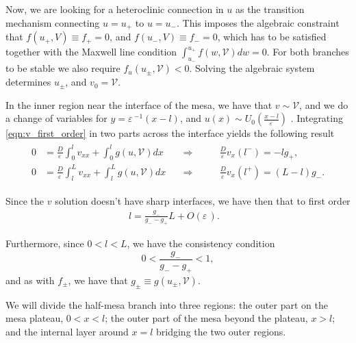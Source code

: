 \documentclass[a4paper,10pt]{article}
\newcommand{\Ep}{\ensuremath{\varepsilon\,}}
\newcommand{\VV}{\ensuremath{\mathcal{V}}}
\begin{document}
Now, we are looking for a heteroclinic connection in $u$ as the transition mechanism connecting $u=u_+$ to $u=u_-$. This imposes the algebraic constraint that $f(u_+,V)\equiv f_+ = 0$, and $ f(u_-,V) \equiv f_- = 0$, which has to be satisfied together with the Maxwell line condition \cite{maxwell1994} $\int_{u_-}^{u_+} f(w,\VV)dw = 0$. For both branches to be stable we also require $f_u(u_{\pm},\VV)<0$. Solving the algebraic system determines $u_{\pm}$, and $v_0=\VV$.

In the inner region near the interface of the mesa, we have that $v\sim\VV$, and we do a change of variables for $y=\Ep^{-1}(x-l)$, and $u(x)\sim U_0(\frac{x-l}{\Ep})$ . Integrating \eqref{eqn:v_first_order} in two parts across the interface yields the following result
% 
\begin{equation*}
\label{eqn:w_eqn}
\begin{split}
\begin{aligned}
  0 &= \frac{D}{\Ep}\int_0^lv_{xx}+\int_0^lg(u,\VV)dx\quad&\Rightarrow&\qquad \frac{D}{\Ep}v_x(l^-)=-lg_+,\\
  0 &= \frac{D}{\Ep}\int_l^Lv_{xx}+\int_l^Lg(u,\VV)dx\quad&\Rightarrow&\qquad \frac{D}{\Ep}v_x(l^+)=(L-l)g_-.
\end{aligned}
\end{split}
\end{equation*}

Since the $v$ solution doesn't have sharp interfaces, we have then that to first order
% 
\begin{equation}
\label{eqn:l_eqn}
\begin{split}
  l = \frac{g_-}{g_- - g_+}L + O(\Ep).
\begin{aligned}
\end{aligned}
\end{split}
\end{equation}
% 

Furthermore, since $0<l<L$, we have the consistency condition
% 
\begin{equation*}
  0<\frac{g_-}{g_- - g_+}<1,
\end{equation*}
% 
and as with $f_{\pm}$, we have that $g_{\pm} \equiv g(u_{\pm},\VV)$.

We will divide the half-mesa branch into three regions: the outer part on the mesa plateau, $0<x<l$; the outer part of the mesa beyond the plateau, $x>l$; and the internal layer around $x=l$ bridging the two outer regions.
\end{document}

